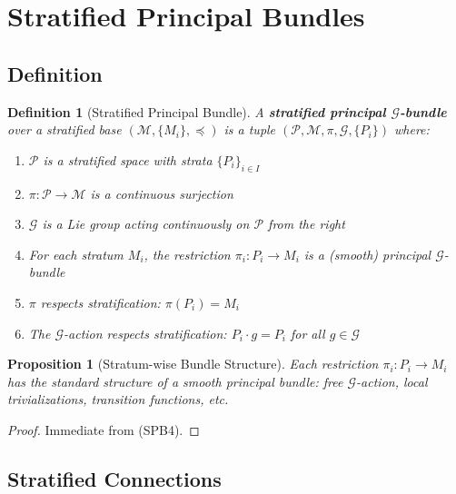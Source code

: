 \documentclass[11pt,a4paper]{article}
\newtheorem{proposition}[theorem]{Proposition}
\newtheorem{definition}[theorem]{Definition}
\begin{document}
\section{Stratified Principal Bundles}\label{sec:bundles}

\subsection{Definition}

\begin{definition}[Stratified Principal Bundle]
A \textbf{stratified principal $\mathcal{G}$-bundle} over a stratified base $(\mathcal{M}, \{M_i\}, \preceq)$ is a tuple $(\mathcal{P}, \mathcal{M}, \pi, \mathcal{G}, \{P_i\})$ where:
\begin{enumerate}
    \item[\textup{(SPB1)}] $\mathcal{P}$ is a stratified space with strata $\{P_i\}_{i \in I}$
    \item[\textup{(SPB2)}] $\pi : \mathcal{P} \to \mathcal{M}$ is a continuous surjection
    \item[\textup{(SPB3)}] $\mathcal{G}$ is a Lie group acting continuously on $\mathcal{P}$ from the right
    \item[\textup{(SPB4)}] For each stratum $M_i$, the restriction $\pi_i : P_i \to M_i$ is a (smooth) principal $\mathcal{G}$-bundle
    \item[\textup{(SPB5)}] $\pi$ respects stratification: $\pi(P_i) = M_i$
    \item[\textup{(SPB6)}] The $\mathcal{G}$-action respects stratification: $P_i \cdot g = P_i$ for all $g \in \mathcal{G}$
\end{enumerate}
\end{definition}

\begin{proposition}[Stratum-wise Bundle Structure]
Each restriction $\pi_i : P_i \to M_i$ has the standard structure of a smooth principal bundle: free $\mathcal{G}$-action, local trivializations, transition functions, etc.
\end{proposition}

\begin{proof}
Immediate from (SPB4).
\end{proof}

\subsection{Stratified Connections}
\end{document}
